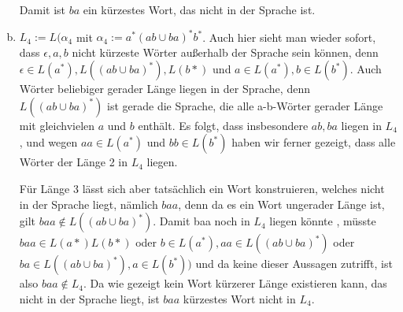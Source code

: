 \documentclass{article}
\begin{document}
\begin{enumerate}[a)]
		Damit ist $ba$ ein kürzestes Wort, das nicht in der Sprache ist.
		
		\item $L_4 := L(\alpha_4$ mit $\alpha_4 := a^*(ab \cup ba)^* b^*$. Auch hier sieht man wieder sofort, dass $\epsilon,a,b$ nicht kürzeste Wörter außerhalb der Sprache sein können, denn $\epsilon \in L(a^*),L((ab\cup ba)^*),L(b*)$ und $a\in L(a^*), b\in L(b^*)$. Auch Wörter beliebiger gerader Länge liegen in der Sprache, denn $L((ab \cup ba)^*)$ ist gerade die Sprache, die alle a-b-Wörter gerader Länge mit gleichvielen $a$ und $b$ enthält. Es folgt, dass insbesondere $ab,ba$ liegen in $L_4$, und wegen $aa \in L(a^*)$ und $bb \in L(b^*)$ haben wir ferner gezeigt, dass alle Wörter der Länge 2 in $L_4$ liegen.
		
		Für Länge 3 lässt sich aber tatsächlich ein Wort konstruieren, welches nicht in der Sprache liegt, nämlich $baa$, denn da es ein Wort ungerader Länge ist, gilt $baa \not \in L((ab \cup ba)^*)$. Damit baa noch in $L_4$ liegen könnte , müsste $baa \in L(a*)L(b*)$ oder $b\in L(a^*), aa \in L((ab \cup ba)^*)$  oder $ba \in L((ab \cup ba)^*), a \in L(b^*))$ und da keine dieser Aussagen zutrifft, ist also $baa \not\in L_4$. Da wie gezeigt kein Wort kürzerer Länge existieren kann, das nicht in der Sprache liegt, ist $baa$ kürzestes Wort nicht in $L_4$.
		
	\end{enumerate}
	
	
\end{document}
